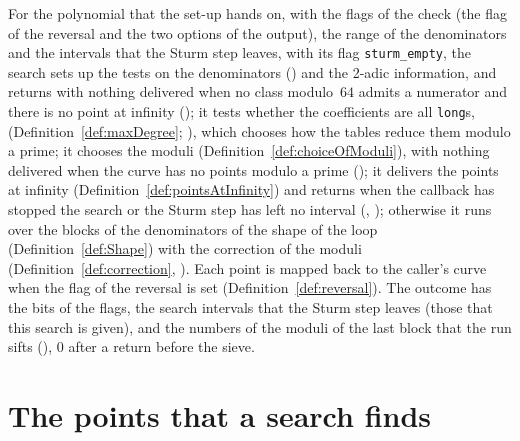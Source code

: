 \begin{definition}\label{def:searchPoints}
  \leanok
  For the polynomial that the set-up hands on, with the flags of the check (the flag of the reversal
  and the two options of the output), the range of the denominators and the intervals that the Sturm
  step leaves, with its flag \verb|sturm_empty|, the search sets up the tests on the denominators
  () and the 2-adic information, and returns with nothing
  delivered when no class modulo~$64$ admits a numerator and there is no point at infinity
  (); it tests whether the coefficients are all \verb|long|s,
  (Definition~\ref{def:maxDegree}; ), which chooses how the tables reduce them modulo a prime; it
  chooses the moduli
  (Definition~\ref{def:choiceOfModuli}), with nothing delivered when the curve has no points modulo
  a prime (); it delivers the points at infinity
  (Definition~\ref{def:pointsAtInfinity}) and returns when the callback has stopped the search or
  the Sturm step has left no interval (,
  ); otherwise it runs over the blocks of the denominators of the
  shape of the loop (Definition~\ref{def:Shape}) with the correction of the moduli
  (Definition~\ref{def:correction}, ). Each point is mapped back
  to the caller's curve when the flag of the reversal is set (Definition~\ref{def:reversal}). The
  outcome has the bits of the flags, the search intervals that the Sturm step leaves (those that
  this search is given), and the numbers of the moduli of the last block that the run sifts
  (), $0$ after a return before the sieve.
\end{definition}

\section{The points that a search finds}\label{sec:theoremsPoints}

